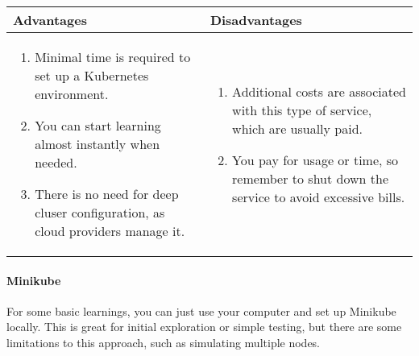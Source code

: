 \begin{tabularx}{\textwidth}{|X|X|}
	\hline
	\cellcolor{DarkOliveGreen2}\textbf{Advantages} & \cellcolor{Tomato1}\textbf{Disadvantages} \\
	\hline
	\begin{enumerate}
		\item Minimal time is required to set up a Kubernetes environment.
		\item You can start learning almost instantly when needed.
		\item There is no need for deep cluser configuration, as cloud providers manage it.
	\end{enumerate}
	
	&
	
	\begin{enumerate}
		\item Additional costs are associated with this type of service, which are usually paid.
		\item You pay for usage or time, so remember to shut down the service to avoid excessive bills.
	\end{enumerate}\\
	\hline
\end{tabularx}


\paragraph{Minikube} For some basic learnings, you can just use your computer and set up Minikube locally. This is great for initial exploration or simple testing, but there are some limitations to this approach, such as simulating multiple nodes.\\

